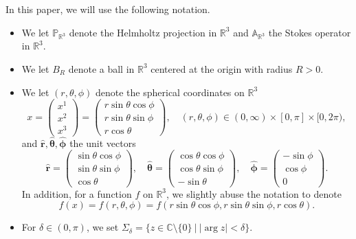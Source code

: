 \documentclass[11pt,a4paper]{article}
\numberwithin{equation}{section}
\newcommand{\R}{\mathbb{R}}
\newcommand{\C}{\mathbb{C}}
\newcommand{\oparg}{\operatorname{arg}}
\begin{document}
In this paper, we will use the following notation.
\begin{itemize}
\item
We let ${\mathbb P}_{\R^3}$ denote the Helmholtz projection in $\R^3$ and ${\mathbb A}_{\R^3}$ the Stokes operator in $\R^3$. 


\item
We let $B_R$ denote a ball in $\R^3$ centered at the origin with radius $R>0$.


\item
We let $(r,\theta,\phi)$ denote the spherical coordinates on $\R^{3}$
\[
    x
    =
    \left(
    \begin{matrix}
    x^{1}\\
    x^{2}\\
    x^{3}
    \end{matrix}
    \right)
    =
    \left(
    \begin{matrix}
    r\sin \theta \cos \phi\\
    r\sin \theta \sin \phi\\
    r\cos \theta
    \end{matrix}
    \right),
    \quad
    (r,\theta,\phi)
    \in
    (0,\infty)
    \times
    [0,\pi]
    \times
    [0,2\pi), 
\]
and $\bm{\hat r},\bm{\hat \theta},\bm{\hat \phi}$ the unit vectors
\[
    \bm{\hat r}
    =
    \left(
    \begin{matrix}
    \sin \theta \cos \phi\\
    \sin \theta \sin \phi\\
    \cos \theta
    \end{matrix}
    \right),
    \quad
    \bm{\hat \theta}
    =
    \left(
    \begin{matrix}
    \cos \theta \cos \phi\\
    \cos \theta \sin \phi\\
    -\sin \theta
    \end{matrix}
    \right),
    \quad
    \bm{\hat \phi}
    =
    \left(
    \begin{matrix}
    -\sin \phi\\
    \cos \phi\\
    0
    \end{matrix}
    \right).
\]
In addition, for a function $f$ on $\R^{3}$, we slightly abuse the notation to denote 
\[
f(x)
=f(r,\theta,\phi)
=f(r\sin\theta \cos\phi, r\sin\theta \sin\phi, r\cos\theta).
\]


\item
For $\delta\in(0,\pi)$, we set 
$
    \Sigma_\delta 
    = \{z\in\C\setminus\{0\}~|~|\oparg z|<\delta\}. 
$



\end{itemize}
\end{document}
